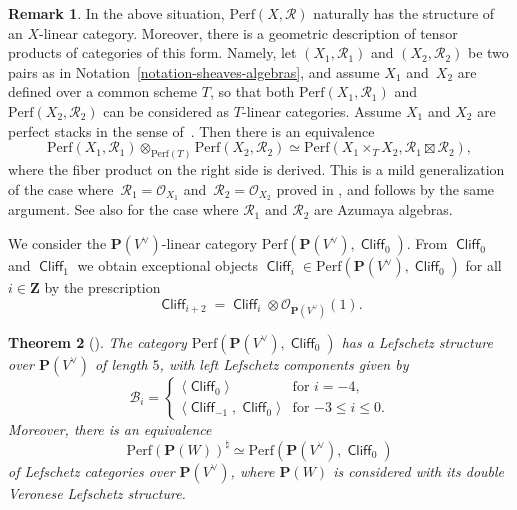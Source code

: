 \documentclass[11pt, reqno]{amsart}
\numberwithin{equation}{section}
\theoremstyle{plain}
\newtheorem{theorem}{Theorem}[section]
\theoremstyle{definition}
\newtheorem{remark}[theorem]{Remark}
\newcommand{\Perf}{\mathrm{Perf}}
\newcommand{\hpd}{{\natural}}
\newcommand{\svee}{\scriptscriptstyle\vee}
\DeclareMathOperator{\Cl}{\mathsf{Cliff}}
\newcommand{\vV}{V^{\svee}}
\newcommand{\cO}{\mathcal{O}}
\newcommand{\cB}{\mathcal{B}}
\newcommand{\cR}{\mathcal{R}}
\newcommand{\bZ}{\mathbf{Z}}
\newcommand{\bP}{\mathbf{P}}
\begin{document}
\begin{remark}
\label{remark-tensor-sheaves-algebras} 
In the above situation, $\Perf(X, \cR)$ naturally has the structure of an $X$-linear category. 
Moreover, there is a geometric description of tensor products of categories of this form. 
Namely, let $(X_1, \cR_1)$ and $(X_2, \cR_2)$ be two pairs as in Notation~\ref{notation-sheaves-algebras}, 
and assume $X_1$ and~$X_2$ are defined over a common scheme $T$, so that 
both $\Perf(X_1, \cR_1)$ and $\Perf(X_2, \cR_2)$ can be considered as $T$-linear categories. 
Assume $X_1$ and $X_2$ are perfect stacks in the sense of~\cite{bzfn}. 
Then there is an equivalence 
\begin{equation*}
\Perf(X_1, \cR_1) \otimes_{\Perf(T)} \Perf(X_2, \cR_2) \simeq \Perf{\left( X_1 \times_T X_2, \cR_1 \boxtimes \cR_2 \right)} , 
\end{equation*}
where the fiber product on the right side is derived.
This is a mild generalization of the case where~\mbox{$\cR_1 = \cO_{X_1}$} and~\mbox{$\cR_2 = \cO_{X_2}$} 
proved in \cite{bzfn}, and follows by the same argument.
See also \cite{kuznetsov2006hyperplane} for the case where $\cR_1$ and $\cR_2$ are 
Azumaya algebras. 
\end{remark}

We consider the $\bP(\vV)$-linear category $\Perf(\bP(\vV), \Cl_0)$. 
From $\Cl_0$ and $\Cl_1$ we obtain exceptional objects $\Cl_i \in \Perf(\bP(\vV), \Cl_0)$ for 
all $i \in \bZ$ by the prescription  
\begin{equation*}
\Cl_{i+2} = \Cl_i \otimes \cO_{\bP(\vV)}(1). 
\end{equation*} 

\begin{theorem}[{\cite[Theorem 5.4]{kuznetsov08quadrics}}]
\label{theorem-HPD-veronese}
The category $\Perf(\bP(\vV), \Cl_0)$ has a Lefschetz structure 
over $\bP(\vV)$ of length $5$, 
with left Lefschetz components given by 
\begin{equation*}
\cB_i = \begin{cases}
\langle \Cl_0 \rangle & \text{for $i = -4$} , \\
\langle \Cl_{-1}, \Cl_0 \rangle & \text{for $-3 \leq i \leq 0$} . 
\end{cases}
\end{equation*} 
Moreover, there is an equivalence 
\begin{equation*}
\Perf(\bP(W))^{\hpd} \simeq \Perf(\bP(\vV), \Cl_0) 
\end{equation*} 
of Lefschetz categories over $\bP(\vV)$, where $\bP(W)$ is considered 
with its double Veronese Lefschetz structure. 
\end{theorem}
\end{document}
